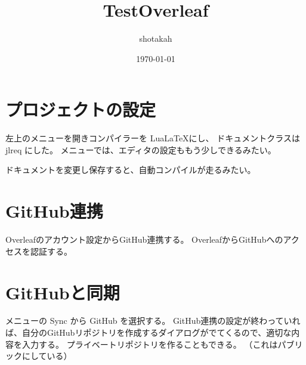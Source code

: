 \documentclass{jlreq}
\title{TestOverleaf}
\author{shotakah}
\date{\today}
\begin{document}
\maketitle

\section{プロジェクトの設定}

左上のメニューを開きコンパイラーを Lua\LaTeX にし、
ドキュメントクラスは jlreq にした。
メニューでは、エディタの設定ももう少しできるみたい。

ドキュメントを変更し保存すると、自動コンパイルが走るみたい。

\section{GitHub連携}

Overleafのアカウント設定からGitHub連携する。
OverleafからGitHubへのアクセスを認証する。

\section{GitHubと同期}

メニューの Sync から GitHub を選択する。
GitHub連携の設定が終わっていれば、自分のGitHubリポジトリを作成するダイアログがでてくるので、適切な内容を入力する。
プライベートリポジトリを作ることもできる。
（これはパブリックにしている）
\end{document}
